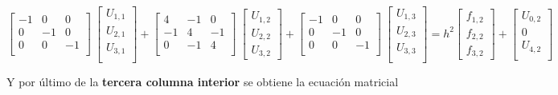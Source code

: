 \documentclass[12pt]{article}
\begin{document}
\begin{equation*}
\begin{bmatrix}
-1 & 0 & 0 \\
0 & -1 & 0 \\
0 & 0 & -1 \\
\end{bmatrix} \
\begin{bmatrix}
U_{1,1} \\ U_{2,1} \\ U_{3,1} \\
\end{bmatrix} +
\begin{bmatrix}
4 & -1 & 0 \\
-1 & 4 & -1 \\
0 & -1 & 4 \\ 
\end{bmatrix} \ 
\begin{bmatrix}
U_{1,2} \\ U_{2,2} \\ U_{3,2} 
\end{bmatrix}+
\begin{bmatrix}
-1 & 0 & 0 \\
0 & -1 & 0 \\
0 & 0 & -1 \\
\end{bmatrix} \
\begin{bmatrix}
U_{1,3} \\ U_{2,3} \\ U_{3,3} \\
\end{bmatrix} = h^2
\begin{bmatrix}
f_{1,2} \\ f_{2,2} \\ f_{3,2}
\end{bmatrix} +
\begin{bmatrix}
U_{0,2} \\  0 \\ U_{4,2} \\
\end{bmatrix}
\end{equation*}

Y por último de la \textbf{tercera columna interior} se obtiene la ecuación matricial
\end{document}
